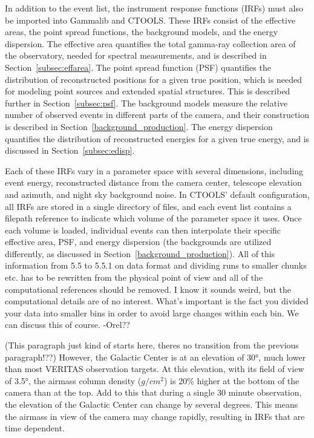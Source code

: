   In addition to the event list, the instrument response functions (IRFs) must also be imported into Gammalib and CTOOLS.
  These IRFs consist of the effective areas, the point spread functions, the background models, and the energy dispersion.
  The effective area quantifies the total gamma-ray collection area of the observatory, needed for spectral measurements, and is described in Section~\ref{subsec:effarea}.
  The point spread function (PSF) quantifies the distribution of reconstructed positions for a given true position, which is needed for modeling point sources and extended spatial structures.
  This is described further in Section~\ref{subsec:psf}.
  The background models measure the relative number of observed events in different parts of the camera, and their construction is described in Section~\ref{background_production}.
  The energy dispersion quantifies the distribution of reconstructed energies for a given true energy, and is discussed in Section~\ref{subsec:edisp}.

  Each of these IRFs vary in a parameter space with several dimensions, including event energy, reconstructed distance from the camera center, telescope elevation and azimuth, and night sky background noise.
  In CTOOLS' default configuration, all IRFs are stored in a single directory of files, and each event list contains a filepath reference to indicate which volume of the parameter space it uses.
  Once each volume is loaded, individual events can then interpolate their specific effective area, PSF, and energy dispersion (the backgrounds are utilized differently, as discussed in Section~\ref{background_production}).
  {\color{red}All of this information from 5.5 to 5.5.1 on data format and dividing runs to smaller chunks etc. has to be rewritten from the physical point of view and all of the computational references should be removed. I know it sounds weird, but the computational details are of no interest. What's important is the fact you divided your data into smaller bins in order to avoid large changes within each bin.  We can discuss this of course. -Orel??}

  {\color{red}(This paragraph just kind of starts here, theres no transition from the previous paragraph!??)}
  However, the Galactic Center is at an elevation of \ang{30}, much lower than most VERITAS observation targets.
  At this elevation, with its field of view of \ang{3.5}, the airmass column density ($g/cm^{2}$) is 20\% higher at the bottom of the camera than at the top.
  Add to this that during a single 30 minute observation, the elevation of the Galactic Center can change by several degrees.
  This means the airmass in view of the camera may change rapidly, resulting in IRFs that are time dependent.

